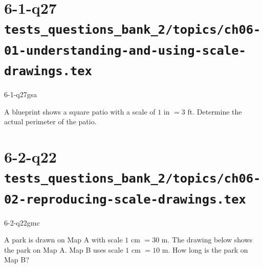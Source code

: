 \documentclass[12pt, fleqn, openany]{studyGuide}
\begin{document}
\newpage
\section*{6-1-q27 \hfill \normalsize\texttt{tests\_questions\_bank\_2/topics/ch06-01-understanding-and-using-scale-drawings.tex}}
\begin{practiceQuestion}{6-1-q27}{gsa}
\begin{questionText}
A blueprint shows a square patio with a scale of $1$ in $= 3$ ft. Determine the actual perimeter of the patio.

\begin{center}
\end{center}
\end{questionText}
\end{practiceQuestion}

\newpage
\section*{6-2-q22 \hfill \normalsize\texttt{tests\_questions\_bank\_2/topics/ch06-02-reproducing-scale-drawings.tex}}
\begin{practiceQuestion}{6-2-q22}{gmc}
\begin{questionText}
A park is drawn on Map A with scale $1$ cm $= 30$ m. The drawing below shows the park on Map A. Map B uses scale $1$ cm $= 10$ m. How long is the park on Map B?

\begin{center}
\end{center}
\end{questionText}
\end{practiceQuestion}
\end{document}
